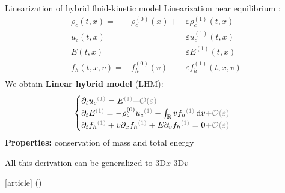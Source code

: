 \documentclass{beamer}
\newcommand{\cmark}{{\color{dgreen}\ding{52}}}
\newcommand{\mbold}[1]{{\textbf{\color{PLB}#1}}}
\newcommand{\customcite}[1]{\citeauthor{#1} (\citeyear{#1})}
\begin{document}
\begin{frame}{Linearization of hybrid fluid-kinetic model}
  Linearization near equilibrium :
  $$
    \begin{aligned}
      \rho_c(t,x)   =& \rho_c^{(0)}(x) + &\varepsilon\rho_c^{(1)}(t,x) \\
         u_c(t,x)   =&                   &\varepsilon u_c^{(1)}(t,x) \\
           E(t,x)   =&                   &\varepsilon E^{(1)}(t,x) \\
         f_h(t,x,v) =& f_h^{(0)}(v)    + &\varepsilon f_h^{(1)}(t,x,v) \\
    \end{aligned}
  $$
  We obtain \mbold{Linear hybrid model} (LHM):
  $$
    \begin{cases}
      \partial_tu_c{\color{gris}^{(1)}}  = E{\color{gris}^{(1)}}  {\color{gris}+ \mathcal{O}(\varepsilon)} \\
      \partial_tE{\color{gris}^{(1)}}    = -\rho_c^{(0)}u_c{\color{gris}^{(1)}} - \int_\mathbb{R}vf_h{\color{gris}^{(1)}}\,\mathrm{d}v {\color{gris}+ \mathcal{O}(\varepsilon)}\\
      \partial_tf_h{\color{gris}^{(1)}}  + v\partial_xf_h{\color{gris}^{(1)}} + E\partial_vf_h{\color{gris}^{(1)}} = 0 {\color{gris}+ \mathcal{O}(\varepsilon)}
    \end{cases}
  $$
  \mbold{Properties:} conservation of mass and total energy \cmark

  All this derivation can be generalized to 3D$x$-3D$v$ \begin{thebibliography}{9}
    [article]
     \customcite{Holderied:2020}
  \end{thebibliography}
\end{frame}
\end{document}
